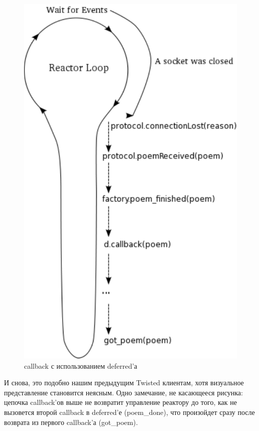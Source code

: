 \begin{figure}[h]
\begin{center}
    \includegraphics[height=0.5\textheight]{images/reactor-deferred-callback.pdf}
    \caption{callback с использованием deferred'а\label{fig:reactor-deferred-callback}}
\end{center}
\end{figure}

И снова, это подобно нашим предыдущим Twisted клиентам, 
хотя визуальное представление становится неясным. 
Одно замечание, не касающееся рисунка: цепочка callback'ов 
выше не возвратит управление реактору до того, как не 
вызовется второй callback в deferred'е (poem\_done), 
что произойдет сразу после возврата из первого callback'а (got\_poem). 


